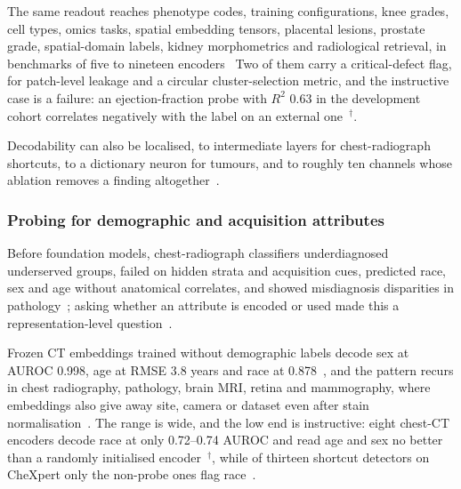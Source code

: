 The same readout reaches phenotype codes, training configurations, knee grades, cell types, omics tasks,
spatial embedding tensors, placental lesions, prostate grade, spatial-domain labels, kidney morphometrics and
radiological retrieval, in benchmarks of five to nineteen
encoders~\cite{lin2026transparent,liang2026cheap,demir2025downstream,cui2026translating,hu2026probing,jamzad2026p3ca,sadman2025interpreting,svatko2026deep,jung2026foundation,steiner2026when,vadori2025mind,bakhta2026frozen,beyeler2024comparing,peng2025benchmarking,gustafsson2024evaluating,kasireddy2025explainable,denner2024leveraging,howard2024generative,ramchandani2026benchmarking,zhao2026benchmarking}
Two of them carry a critical-defect flag, for patch-level leakage and a
circular cluster-selection metric, and the instructive case is a failure: an ejection-fraction probe with
$R^2$ 0.63 in the development cohort correlates negatively with the label on an external
one~\cite{akanova2026interpreting}$^{\dagger}$.

Decodability can also be localised, to intermediate layers for chest-radiograph shortcuts, to a dictionary
neuron for tumours, and to roughly ten channels whose ablation removes a finding
altogether~\cite{pedersen2026look,tamura2025patch,nooralahzadeh2026sparse,goetze2025prediction,basu2026interpretability,nooralahzadeh2026arbitration}.

\subsubsection{Probing for demographic and acquisition attributes}

Before foundation models, chest-radiograph classifiers underdiagnosed underserved groups, failed on hidden
strata and acquisition cues, predicted race, sex and age without anatomical correlates, and showed
misdiagnosis disparities in
pathology~\cite{seyyedkalantari2021underdiagnosis,oakdenrayner2019hidden,degrave2020ai,banerjee2021ai,adleberg2022predicting,korot2021predicting,coyner2021color,burns2023ability,vaidya2024demographic,jones2024causal};
asking whether an attribute is encoded or used made this a representation-level
question~\cite{glocker2023algorithmic,glocker2022risk}.

Frozen CT embeddings trained without demographic labels decode sex at AUROC 0.998, age at RMSE 3.8 years and
race at 0.878~\cite{zheng2024demographic}, and the pattern recurs in chest radiography, pathology, brain MRI,
retina and mammography, where embeddings also give away site, camera or dataset even after stain
normalisation~\cite{sourget2025fairness,dejong2025current,komen2024do,rahbar2026frozen,li2026acquisition,hajishafiezahramini2026dataset,encin2026comparative,lin2025beyond,kmen2026robust}.
The range is wide, and the low end is instructive: eight chest-CT encoders decode race at only 0.72--0.74
AUROC and read age and sex no better than a randomly initialised
encoder~\cite{tariq2024self}$^{\dagger}$, while of thirteen shortcut detectors on CheXpert only the non-probe
ones flag race~\cite{cajas2026shortkit}.

